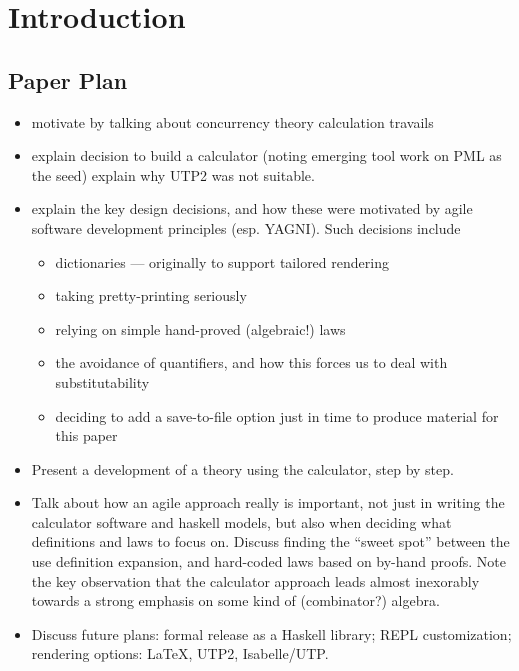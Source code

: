 \section{Introduction}\label{sec:Intro}


\subsection*{Paper Plan}

\begin{itemize}
  \item motivate by talking about
  concurrency theory calculation travails
  \item explain decision to build a calculator
   (noting emerging tool work on PML as the seed)
   explain why UTP2 was not suitable.
  \item
     explain the key design decisions,
     and how these were motivated by agile software development
     principles (esp. YAGNI).
     Such decisions include
     \begin{itemize}
       \item dictionaries --- originally to support tailored rendering
       \item taking pretty-printing seriously
       \item relying on simple hand-proved (algebraic!) laws
       \item the avoidance of quantifiers,
        and how this forces us to deal with substitutability
       \item deciding to add a save-to-file option
        just in time to produce material for this paper
     \end{itemize}
  \item
     Present a development of a theory using the calculator,
     step by step.
  \item
    Talk about how an agile approach really is important,
    not just in writing the calculator software and haskell models,
    but also when deciding what definitions and laws to focus on.
    Discuss finding the ``sweet spot'' between the use definition
    expansion, and hard-coded laws based on by-hand proofs.
    Note the key observation that the calculator approach
    leads almost inexorably towards a strong emphasis
    on some kind of (combinator?) algebra.
  \item
    Discuss future plans: formal release as a Haskell library;
    REPL customization; rendering options: \LaTeX, UTP2, Isabelle/UTP.
\end{itemize}
